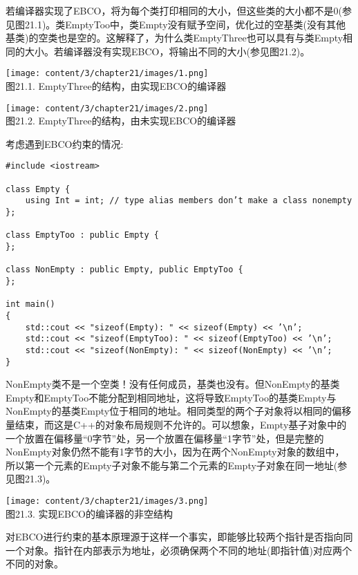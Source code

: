 若编译器实现了EBCO，将为每个类打印相同的大小，但这些类的大小都不是0(参见图21.1)。类EmptyToo中，类Empty没有赋予空间，优化过的空基类(没有其他基类)的空类也是空的。这解释了，为什么类EmptyThree也可以具有与类Empty相同的大小。若编译器没有实现EBCO，将输出不同的大小(参见图21.2)。

\begin{center}
\texttt{[image: content/3/chapter21/images/1.png]} \\
图21.1. EmptyThree的结构，由实现EBCO的编译器
\end{center}

\begin{center}
\texttt{[image: content/3/chapter21/images/2.png]} \\
图21.2. EmptyThree的结构，由未实现EBCO的编译器
\end{center}

考虑遇到EBCO约束的情况:

\begin{lstlisting}[style=styleCXX]
#include <iostream>

class Empty {
	using Int = int; // type alias members don’t make a class nonempty
};

class EmptyToo : public Empty {
};

class NonEmpty : public Empty, public EmptyToo {
};

int main()
{
	std::cout << "sizeof(Empty): " << sizeof(Empty) << ’\n’;
	std::cout << "sizeof(EmptyToo): " << sizeof(EmptyToo) << ’\n’;
	std::cout << "sizeof(NonEmpty): " << sizeof(NonEmpty) << ’\n’;
}
\end{lstlisting}

NonEmpty类不是一个空类！没有任何成员，基类也没有。但NonEmpty的基类Empty和EmptyToo不能分配到相同地址，这将导致EmptyToo的基类Empty与NonEmpty的基类Empty位于相同的地址。相同类型的两个子对象将以相同的偏移量结束，而这是C++的对象布局规则不允许的。可以想象，Empty基子对象中的一个放置在偏移量“0字节”处，另一个放置在偏移量“1字节”处，但是完整的NonEmpty对象仍然不能有1字节的大小，因为在两个NonEmpty对象的数组中，所以第一个元素的Empty子对象不能与第二个元素的Empty子对象在同一地址(参见图21.3)。

\begin{center}
\texttt{[image: content/3/chapter21/images/3.png]} \\
图21.3. 实现EBCO的编译器的非空结构
\end{center}

对EBCO进行约束的基本原理源于这样一个事实，即能够比较两个指针是否指向同一个对象。指针在内部表示为地址，必须确保两个不同的地址(即指针值)对应两个不同的对象。

